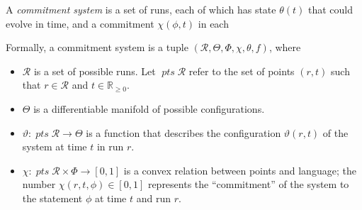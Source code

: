 \documentclass{article}
\newcommand\pts{\mathop{\mathit{pts}}}
\begin{document}
    
    
    \begin{defn}
        A \emph{commitment system}
        is a set of runs, each of which has state $\theta(t)$ that could evolve in time,
        and a commitment $\chi(\phi, t)$ in each 
        
        Formally, a commitment system is a tuple 
        $(\mathcal R, \Theta, \Phi, \chi, \theta, f)$,
        where
        \begin{itemize}[]
            \item $\mathcal R$ is a set of possible runs.
            Let $\pts \mathcal R$ refer to the set of points $(r,t)$ such that $r \in \mathcal R$ and $t \in \mathbb R_{\ge 0}$.
            \item $\Theta$ is a differentiable manifold of possible configurations.
            \item $\vartheta : \pts \mathcal R \to \Theta$ is a function that                describes the configuration $\vartheta(r,t)$ of the system at time $t$ in run $r$.
            \item
            $\chi: \pts \mathcal R \times \Phi \to [0,1]$
            is a convex relation between points and language; 
            the number $\chi(r, t, \phi) \in [0,1]$ represents the ``commitment'' of the system to the statement $\phi$ at time $t$ and run $r$.
            

\end{itemize}
\end{defn}
\end{document}
